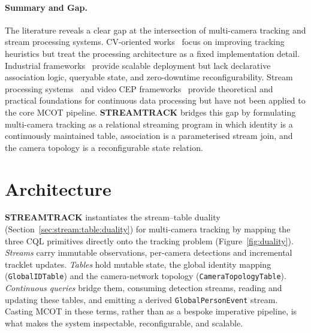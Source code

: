 \documentclass[review]{elsarticle}
\begin{document}
\paragraph{Summary and Gap.}
The literature reveals a clear gap at the intersection of multi-camera tracking and stream processing systems. CV-oriented works~\cite{yoshida2024overlap,kim2024cluster,xie2024robust,specker2024ocmctrack,yang2024online} focus on improving tracking heuristics but treat the processing architecture as a fixed implementation detail. Industrial frameworks~\cite{nvidia2024deepstream,nvidia2025metropolis} provide scalable deployment but lack declarative association logic, queryable state, and zero-downtime reconfigurability. Stream processing systems~\cite{sax2018streams,carbone2015flink,kreps2011kafka} and video CEP frameworks~\cite{yadav2019vidcep} provide theoretical and practical foundations for continuous data processing but have not been applied to the core MCOT pipeline. \textbf{STREAMTRACK} bridges this gap by formulating multi-camera tracking as a relational streaming program in which identity is a continuously maintained table, association is a parameterised stream join, and the camera topology is a reconfigurable state relation.


\section{Architecture}\label{sec:overview}

\textbf{STREAMTRACK} instantiates the stream--table duality
(Section~\ref{sec:stream:table:duality}) for multi-camera tracking by mapping the three CQL primitives directly onto the tracking problem (Figure~\ref{fig:duality}). \emph{Streams} carry immutable observations, per-camera detections and incremental tracklet updates. \emph{Tables} hold mutable state, the global identity mapping (\texttt{GlobalIDTable}) and the camera-network topology (\texttt{CameraTopologyTable}). \emph{Continuous queries} bridge them, consuming detection streams, reading and updating these tables, and emitting a derived \texttt{GlobalPersonEvent} stream. Casting MCOT in these terms, rather than as a bespoke imperative pipeline, is what makes the system inspectable, reconfigurable, and scalable.
\end{document}
